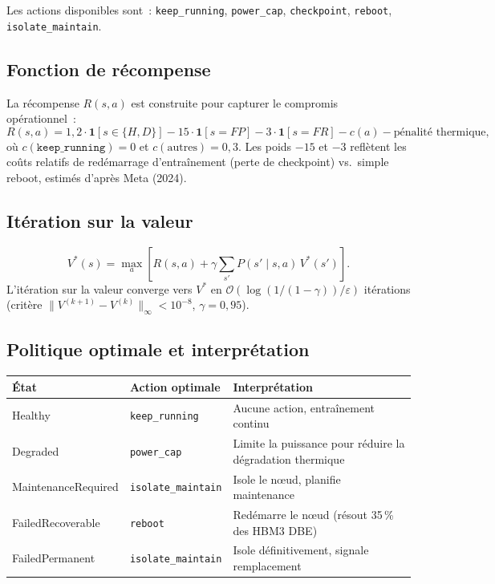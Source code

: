\documentclass[12pt,a4paper]{article}
\begin{document}
Les actions disponibles sont~:
\texttt{keep\_running}, \texttt{power\_cap}, \texttt{checkpoint},
\texttt{reboot}, \texttt{isolate\_maintain}.

\subsection{Fonction de récompense}

La récompense $R(s,a)$ est construite pour capturer le compromis opérationnel~:
\[
R(s,a) = 1{,}2 \cdot \mathbf{1}[s \in \{H,D\}]
         - 15 \cdot \mathbf{1}[s = FP]
         - 3 \cdot \mathbf{1}[s = FR]
         - c(a)
         - \text{pénalité thermique},
\]
où $c(\texttt{keep\_running})=0$ et $c(\text{autres})=0{,}3$.
Les poids $-15$ et $-3$ reflètent les coûts relatifs de redémarrage d'entraînement
(perte de checkpoint) vs.\ simple reboot, estimés d'après Meta (2024).

\subsection{Itération sur la valeur}

\[
V^*(s) = \max_a \left[ R(s,a) + \gamma \sum_{s'} P(s'\mid s,a)\,V^*(s') \right].
\]
L'itération sur la valeur converge vers $V^*$ en $\mathcal{O}(\log(1/(1-\gamma))/\varepsilon)$ itérations
(critère $\|V^{(k+1)} - V^{(k)}\|_\infty < 10^{-8}$, $\gamma = 0{,}95$).

\subsection{Politique optimale et interprétation}

\begin{center}
\begin{tabular}{llp{7cm}}
\toprule
État & Action optimale & Interprétation \\
\midrule
Healthy & \texttt{keep\_running} & Aucune action, entraînement continu \\
Degraded & \texttt{power\_cap} & Limite la puissance pour réduire la dégradation thermique \\
MaintenanceRequired & \texttt{isolate\_maintain} & Isole le nœud, planifie maintenance \\
FailedRecoverable & \texttt{reboot} & Redémarre le nœud (résout 35\,\% des HBM3 DBE) \\
FailedPermanent & \texttt{isolate\_maintain} & Isole définitivement, signale remplacement \\
\bottomrule
\end{tabular}
\end{center}
\end{document}
